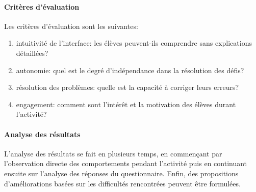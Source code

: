\paragraph{Critères d’évaluation}
Les critères d'évaluation sont les suivantes:
\begin{enumerate}
    \item intuitivité de l'interface: les élèves peuvent-ils comprendre sans explications détaillées?
    \item autonomie: quel est le degré d'indépendance dans la résolution des défis?
    \item résolution des problèmes: quelle est la capacité à corriger leurs erreurs?
    \item engagement: comment sont l'intérêt et la motivation des élèves durant l'activité?
\end{enumerate}

\paragraph{Analyse des résultats}
L'analyse des résultats se fait en plusieurs temps, en commençant par l'observation directe des comportements pendant l'activité puis en continuant ensuite sur l'analyse des réponses du questionnaire.
Enfin, des propositions d'améliorations basées sur les difficultés rencontrées peuvent être formulées.
